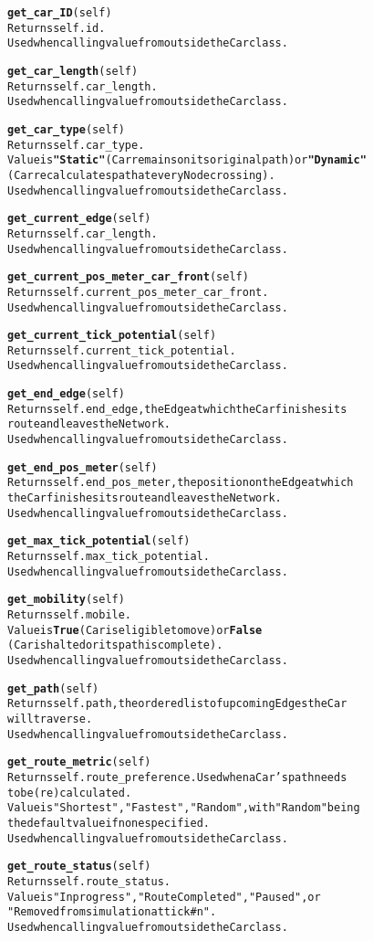\begin{alltt}
\textbf{get_car_ID}(self)
Returns self.id.
Used when calling value from outside the Car class.

\textbf{get_car_length}(self)
Returns self.car_length.
Used when calling value from outside the Car class.

\textbf{get_car_type}(self)
Returns self.car_type.
Value is \textbf{"Static"} (Car remains on its original path) or \textbf{"Dynamic"}
(Car recalculates path at every Node crossing).
Used when calling value from outside the Car class.

\textbf{get_current_edge}(self)
Returns self.car_length.
Used when calling value from outside the Car class.

\textbf{get_current_pos_meter_car_front}(self)
Returns self.current_pos_meter_car_front.
Used when calling value from outside the Car class.

\textbf{get_current_tick_potential}(self)
Returns self.current_tick_potential.
Used when calling value from outside the Car class.

\textbf{get_end_edge}(self)
Returns self.end_edge, the Edge at which the Car finishes its 
route and leaves the Network.
Used when calling value from outside the Car class.

\textbf{get_end_pos_meter}(self)
Returns self.end_pos_meter, the position on the Edge at which 
the Car finishes its route and leaves the Network.
Used when calling value from outside the Car class.

\textbf{get_max_tick_potential}(self)
Returns self.max_tick_potential.
Used when calling value from outside the Car class.

\textbf{get_mobility}(self)
Returns self.mobile.
Value is \textbf{True} (Car is eligible to move) or \textbf{False} 
(Car is halted or its path is complete).
Used when calling value from outside the Car class.

\textbf{get_path}(self)
Returns self.path, the ordered list of upcoming Edges the Car
will traverse.
Used when calling value from outside the Car class.

\textbf{get_route_metric}(self)
Returns self.route_preference.  Used when a Car's path needs 
to be (re)calculated.
Value is "Shortest", "Fastest", "Random", with "Random" being 
the default value if none specified.
Used when calling value from outside the Car class.

\textbf{get_route_status}(self)
Returns self.route_status.
Value is "In progress", "Route Completed", "Paused", or 
"Removed from simulation at tick #n".
Used when calling value from outside the Car class.


\end{alltt}
